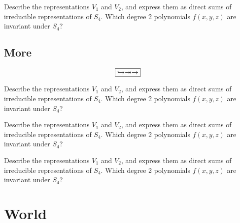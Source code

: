 \documentclass{notes}
\begin{document}
\begin{example}
Describe the representations $V_1$ and $V_2$, and express them as direct sums of irreducible representations of $S_4$. Which degree 2 polynomials $f(x,y,z)$ are invariant under $S_4$?
\end{example}

\subsection{More}

\lipsum[3]


\[
\boxed{\hookrightarrow\twoheadrightarrow\to}
\]

\begin{remark}
Describe the representations $V_1$ and $V_2$, and express them as direct sums of irreducible representations of $S_4$. Which degree 2 polynomials $f(x,y,z)$ are invariant under $S_4$?

\end{remark}

\begin{fact}
Describe the representations $V_1$ and $V_2$, and express them as direct sums of irreducible representations of $S_4$. Which degree 2 polynomials $f(x,y,z)$ are invariant under $S_4$?
\end{fact}


\begin{digression}
Describe the representations $V_1$ and $V_2$, and express them as direct sums of irreducible representations of $S_4$. Which degree 2 polynomials $f(x,y,z)$ are invariant under $S_4$?
\lipsum[5]
\end{digression}


\section{World}

\lipsum[4]
\end{document}
